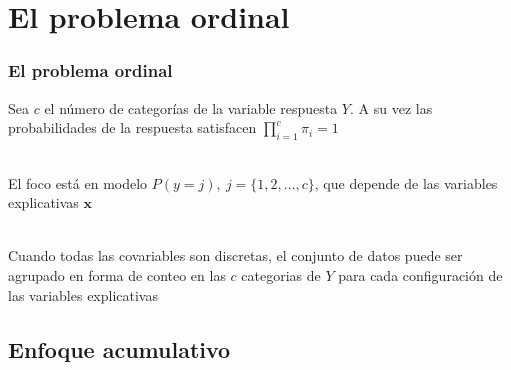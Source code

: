 \documentclass[]{beamer}
\begin{document}
\section{El problema ordinal}
\begin{frame}
	\frametitle{El problema ordinal}	

	Sea $c$ el número de categorías de la variable respuesta $Y$. A su vez 
	las probabilidades de  la respuesta satisfacen $\prod_{i=1}^c\pi_i=1$\\~\ 

	El foco está en modelo $P(y=j),\ j=\{1,2,\ldots ,c\}$, que depende de las variables explicativas $\mathbf{x}$ \\~\  

	Cuando todas las covariables son discretas, el conjunto de datos puede ser 
	agrupado en forma de conteo en las $c$ categorias de $Y$ para cada 
	configuración de las variables explicativas

\end{frame}

\subsection{Enfoque acumulativo}

\end{document}
